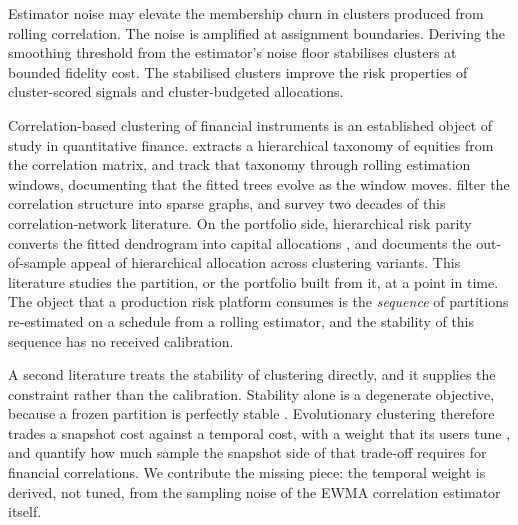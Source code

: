\documentclass{rQUF2e}
\theoremstyle{plain}
\theoremstyle{remark}
\begin{document}
Estimator noise may elevate the membership churn in clusters produced from
rolling correlation. The noise is amplified at assignment boundaries. Deriving
the smoothing threshold from the estimator's noise floor stabilises clusters at
bounded fidelity cost. The stabilised clusters improve the risk properties of
cluster-scored signals and cluster-budgeted allocations.

Correlation-based clustering of financial instruments is an established object
of study in quantitative finance. \citet{mantegna1999hierarchical} extracts a
hierarchical taxonomy of equities from the correlation matrix, and
\citet{onnela2003dynamics} track that taxonomy through rolling estimation
windows, documenting that the fitted trees evolve as the window moves.
\citet{tumminello2005tool} filter the correlation structure into sparse
graphs, and \citet{marti2021review} survey two decades of this
correlation-network literature. On the portfolio side, hierarchical risk
parity converts the fitted dendrogram into capital allocations
\citep{lopezdeprado2016building, lopezdeprado2020machine}, and
\citet{raffinot2017hierarchical} documents the out-of-sample appeal of
hierarchical allocation across clustering variants. This literature studies
the partition, or the portfolio built from it, at a point in time. The object
that a production risk platform consumes is the \emph{sequence} of partitions
re-estimated on a schedule from a rolling estimator, and the stability of this
sequence has no received calibration.

A second literature treats the stability of clustering directly, and it
supplies the constraint rather than the calibration. Stability alone is a
degenerate objective, because a frozen partition is perfectly stable
\citep{bendavid2006sober, vonluxburg2010clustering}. Evolutionary clustering
therefore trades a snapshot cost against a temporal cost, with a weight that
its users tune \citep{chakrabarti2006evolutionary, xu2014adaptive}, and
\citet{marti2016clustering} quantify how much sample the snapshot side of that
trade-off requires for financial correlations. We contribute the missing
piece: the temporal weight is derived, not tuned, from the sampling noise of
the EWMA correlation estimator itself.
\end{document}
